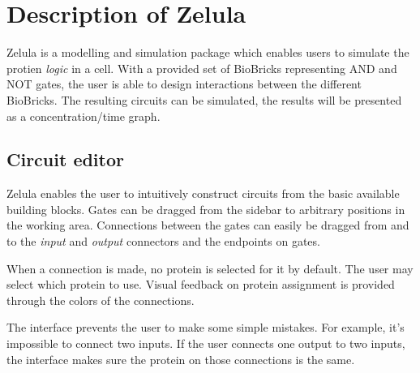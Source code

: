 

\newcommand{\screenshotScale}{1.4}



\section{Description of Zelula}
Zelula is a modelling and simulation package which enables users to simulate the protien \textit{logic} in a cell. With a provided set of BioBricks representing AND and NOT gates, the user is able to design interactions between the different BioBricks. The resulting circuits can be simulated, the results will be presented as a concentration/time graph.


\subsection{Circuit editor}
\begin{figure}[h!]
\centering{}
\end{figure}

\noindent Zelula enables the user to intuitively construct circuits from the basic available building blocks. Gates can be dragged from the sidebar to arbitrary positions in the working area. Connections between the gates can easily be dragged from and to the \textit{input} and \textit{output} connectors and the endpoints on gates. 

When a connection is made, no protein is selected for it by default. The user may select which protein to use. Visual feedback on protein assignment is provided through the colors of the connections.

The interface prevents the user to make some simple mistakes. For example, it's impossible to connect two inputs. If the user connects one output to two inputs, the interface makes sure the protein on those connections is the same.

